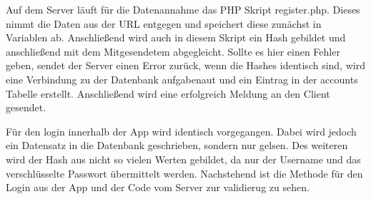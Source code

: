 		Auf dem Server läuft für die Datenannahme das PHP Skript register.php. Dieses nimmt die Daten aus der URL entgegen und speichert diese zunächst in Variablen ab. Anschließend wird auch in diesem Skript ein Hash gebildet und anschließend mit dem Mitgesendetem abgegleicht. Sollte es hier einen Fehler geben, sendet der Server einen Error zurück, wenn die Hashes identisch sind, wird eine Verbindung zu der Datenbank aufgabenaut und ein Eintrag in der accounts Tabelle erstellt. Anschließend wird eine erfolgreich Meldung an den Client gesendet.

		Für den login innerhalb der App wird identisch vorgegangen. Dabei wird jedoch ein Datensatz in die Datenbank geschrieben, sondern nur gelsen. Des weiteren wird der Hash aus nicht so vielen Werten gebildet, da nur der Username und das verschlüsselte Passwort übermittelt werden. Nachstehend ist die Methode für den Login aus der App und der Code vom Server zur validierug zu sehen.
\begin{scriptsize}
\lstset{
	float,
	caption=Skript SendDataToServer.cs, 
	language=[Sharp]C, 
	frame=single,  
	showstringspaces=false, 
	showspaces=false, 
	numbers=left, 
	captionpos=b, 
	belowcaptionskip=4pt,
	basicstyle=\ttfamily
} 
\begin{lstlisting}[label=lst:c_Login]

\end{lstlisting}
\end{scriptsize}